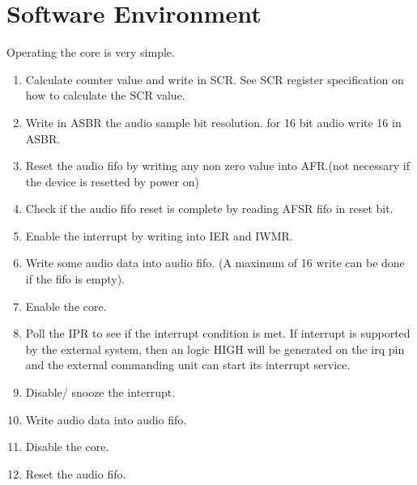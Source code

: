 \documentclass[12pt,a4paper]{report}
\begin{document}
\chapter{Software Environment}
\thispagestyle{logo}

Operating the core is very simple.
\begin{enumerate}
\item Calculate counter value and write in SCR. See SCR register specification on how to calculate the SCR value.
\item Write in ASBR the audio sample bit resolution. for 16 bit audio write 16 in ASBR.
\item Reset the audio fifo by writing any non zero value into  AFR.(not necessary if the device is resetted by power on)
\item Check if the audio fifo reset is complete by reading AFSR fifo in reset bit.
\item Enable the interrupt by writing into IER and IWMR.
\item Write some audio data into audio fifo. (A maximum of 16 write can be done if the fifo is empty).
\item Enable the core.
\item Poll the IPR to see if the interrupt condition is met. If interrupt is supported by the external system, then an logic HIGH will be generated on the irq pin and the external commanding unit can start its interrupt service.
\item Disable/ snooze the interrupt.
\item Write audio data into audio fifo.
\item Disable the core.
\item Reset the audio fifo.


\end{enumerate}
\end{document}
